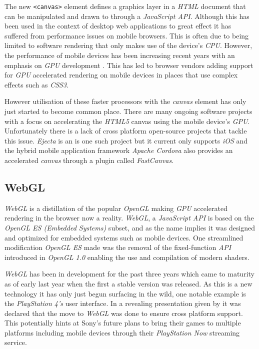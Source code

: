 \documentclass[final]{cmpreport}
\begin{document}
The new \texttt{<canvas>} element defines a graphics layer in a \textit{HTML} document that can be manipulated and drawn to through a \textit{JavaScript API}. Although this has been used in the context of desktop web applications to great effect it has suffered from performance issues on mobile browsers. This is often due to being limited to software rendering that only makes use of the device's \textit{CPU}. However, the performance of mobile devices has been increasing recent years with an emphasis on \textit{GPU} development \cite{Lin}. This has led to browser vendors adding support for \textit{GPU} accelerated rendering on mobile devices in places that use complex effects such as \textit{CSS3}.

However utilisation of these faster processors with the \textit{canvas} element has only just started to become common place. There are many ongoing software projects with a focus on accelerating the \textit{HTML5} canvas using the mobile device's \textit{GPU}. Unfortunately there is a lack of cross platform open-source projects that tackle this issue. \textit{Ejecta} is an is one such project but it current only supports \textit{iOS} and the hybrid mobile application framework \textit{Apache Cordova\footnotemark[6]} also provides an accelerated \textit{canvas} through a plugin called \textit{FastCanvas\footnotemark[7]}.


\subsection{WebGL}
\textit{WebGL} is a distillation of the popular \textit{OpenGL} making \textit{GPU} accelerated rendering in the browser now a reality. \textit{WebGL}, a \textit{JavaScript API} is based on the \textit{OpenGL ES (Embedded Systems)} subset, and as the name implies it was designed and optimized for embedded systems such as mobile devices. One streamlined modification \textit{OpenGL ES} made was the removal of the fixed-function \textit{API} introduced in \textit{OpenGL 1.0} enabling the use and compilation of modern shaders.

\textit{WebGL} has been in development for the past three years which came to maturity as of early last year when the first a stable version was released. As this is a new technology it has only just begun surfacing in the wild, one notable example is the \textit{PlayStation 4's} user interface. In a revealing presentation given by \cite{Olmstead} it was declared that the move to \textit{WebGL} was done to ensure cross platform support. This potentially hints at Sony's future plans to bring their games to multiple platforms including mobile devices through their \textit{PlayStation Now} streaming service.
\end{document}
